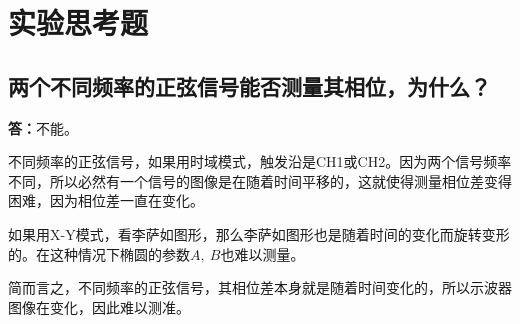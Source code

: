 \documentclass[a4paper,11pt,UTF8]{ctexart}
\begin{document}
\section{实验思考题}
\subsection{两个不同频率的正弦信号能否测量其相位，为什么？}
\textbf{答：}不能。
\par 不同频率的正弦信号，如果用时域模式，触发沿是CH1或CH2。因为两个信号频率不同，所以必然有一个信号的图像是在随着时间平移的，这就使得测量相位差变得困难，因为相位差一直在变化。
\par 如果用X-Y模式，看李萨如图形，那么李萨如图形也是随着时间的变化而旋转变形的。在这种情况下椭圆的参数$A,~B$也难以测量。
\par 简而言之，不同频率的正弦信号，其相位差本身就是随着时间变化的，所以示波器图像在变化，因此难以测准。
\end{document}
